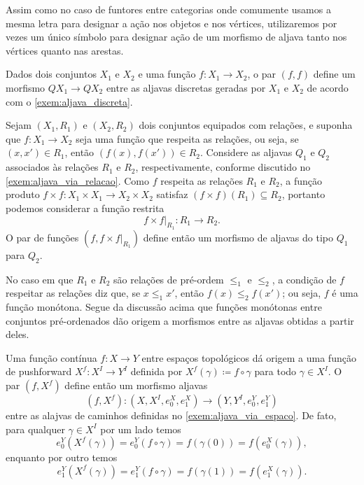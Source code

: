 Assim como no caso de funtores entre categorias onde comumente usamos a mesma letra para designar a ação nos objetos e nos vértices, utilizaremos por vezes um único símbolo para designar ação de um morfismo de aljava tanto nos vértices quanto nas arestas.

\begin{exem}
    Dados dois conjuntos $X_1$ e $X_2$ e uma função $f: X_1 \to X_2$, o par $(f,f)$ define um morfismo $QX_1 \to QX_2$ entre as aljavas discretas geradas por $X_1$ e $X_2$ de acordo com o \cref{exem:aljava_discreta}.
\end{exem}

\begin{exem}
    Sejam $(X_1,R_1)$ e $(X_2,R_2)$ dois conjuntos equipados com relações, e suponha que $f: X_1 \to X_2$ seja uma função que respeita as relações, ou seja, se $(x,x') \in R_1$, então $(f(x),f(x')) \in R_2$.
    Considere as aljavas $Q_1$ e $Q_2$ associados às relações $R_1$ e $R_2$, respectivamente, conforme discutido no \cref{exem:aljava_via_relacao}.
    Como $f$ respeita as relações $R_1$ e $R_2$, a função produto $f \times f: X_1 \times X_1 \to X_2 \times X_2$ satisfaz $(f \times f)(R_1) \subseteq R_2$, portanto podemos considerar a função restrita
    \begin{displaymath}
        f \times f \rvert_{R_1}: R_1 \to R_2.
    \end{displaymath}
    O par de funções $(f,f \times f\rvert_{R_1})$ define então um morfismo de aljavas do tipo $Q_1$ para $Q_2$.
    
    No caso em que $R_1$ e $R_2$ são relações de pré-ordem $\leq_1$ e $\leq_2$, a condição de $f$ respeitar as relações diz que, se $x \leq_1 x'$, então $f(x) \leq_2 f(x')$; ou seja, $f$ é uma função monótona.
    Segue da discussão acima que funções monótonas entre conjuntos pré-ordenados dão origem a morfismos entre as aljavas obtidas a partir deles.
\end{exem}

\begin{exem}
    Uma função contínua $f: X \to Y$ entre espaços topológicos dá origem a uma função de pushforward $X^f: X^I \to Y^{I}$ definida por $X^f(\gamma) \coloneqq f \circ \gamma$ para todo $\gamma \in X^{I}$.
    O par $(f,X^f)$ define então um morfismo aljavas
    \begin{displaymath}
        (f,X^f): (X,X^I,e^X_0,e^X_1) \to (Y,Y^I,e^Y_0,e^Y_1)
    \end{displaymath}
    entre as alajvas de caminhos definidas no \cref{exem:aljava_via_espaco}.
    De fato, para qualquer $\gamma \in X^I$ por um lado temos
    \begin{displaymath}
        e^Y_0(X^f(\gamma)) = e^Y_0(f \circ \gamma) = f(\gamma(0)) = f(e^X_0(\gamma)),
    \end{displaymath}
    enquanto por outro temos
    \begin{displaymath}
        e^Y_1(X^f(\gamma)) = e^Y_1(f \circ \gamma) = f(\gamma(1)) = f(e^X_1(\gamma)).
    \end{displaymath}
\end{exem}

